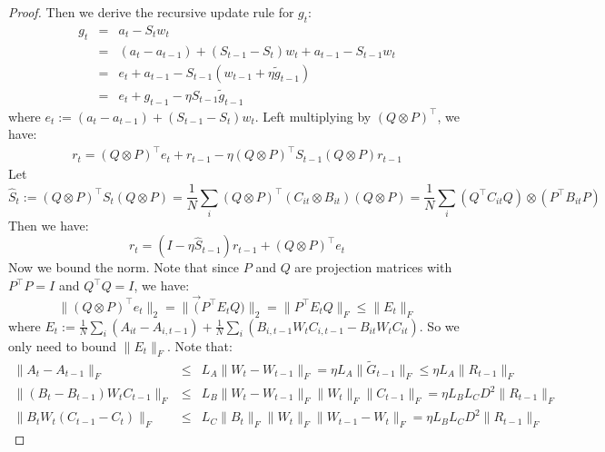\begin{proof}
Then we derive the recursive update rule for $g_t$:
\begin{eqnarray}
    g_t &=& a_t - S_t w_t \\
    &=& (a_t - a_{t-1}) + (S_{t-1} - S_t) w_t + a_{t-1} - S_{t-1}w_t \\ 
    &=& e_t + a_{t-1} - S_{t-1}(w_{t-1} + \eta \tilde g_{t-1}) \\
    &=& e_t + g_{t-1} - \eta S_{t-1} \tilde g_{t-1}  
\end{eqnarray}
where $e_t := (a_t - a_{t-1}) + (S_{t-1} - S_t) w_t$. Left multiplying by $(Q\otimes P)^\top$, we have: 
\begin{eqnarray}
    r_t = (Q\otimes P)^\top e_t + r_{t-1} - \eta (Q\otimes P)^\top S_{t-1} (Q\otimes P)r_{t-1} 
\end{eqnarray}
Let 
\begin{equation}
 \hat S_t := (Q\otimes P)^\top S_t (Q\otimes P) = \frac1N \sum_i (Q\otimes P)^\top (C_{it} \otimes B_{it}) (Q\otimes P) = \frac1N \sum_i (Q^\top C_{it}Q) \otimes (P^\top B_{it} P)   
\end{equation}
Then we have:
\begin{equation}
    r_t = (I - \eta \hat S_{t-1})r_{t-1} + (Q\otimes P)^\top e_t
\end{equation}
Now we bound the norm. Note that since $P$ and $Q$ are projection matrices with $P^\top P = I$ and $Q^\top Q = I$, we have: 
\begin{equation}
\|(Q\otimes P)^\top e_t\|_2 = \|\vec(P^\top E_t Q)\|_2 = \|P^\top E_t Q\|_F \le \|E_t\|_F
\end{equation}
where $E_t := \frac1N\sum_i (A_{it} - A_{i,t-1}) + \frac1N\sum_i (B_{i,t-1} W_t C_{i,t-1} - B_{it} W_t C_{it})$. So we only need to bound $\|E_t\|_F$. Note that:
\begin{eqnarray}
    \|A_t - A_{t-1}\|_F &\le& L_A \|W_t - W_{t-1}\|_F = \eta L_A \|\tilde G_{t-1}\|_F \le \eta L_A \|R_{t-1}\|_F \\
    \|(B_t - B_{t-1})W_t C_{t-1}\|_F &\le& L_B \|W_t - W_{t-1}\|_F \|W_t\|_F \|C_{t-1}\|_F = \eta L_B L_C D^2 \|R_{t-1}\|_F \\ 
    \|B_t W_t (C_{t-1} - C_t)\|_F &\le& L_C  \|B_t\|_F \|W_t\|_F\|W_{t-1} - W_t\|_F = \eta L_B L_C D^2 \|R_{t-1}\|_F 
\end{eqnarray}


\end{proof}
